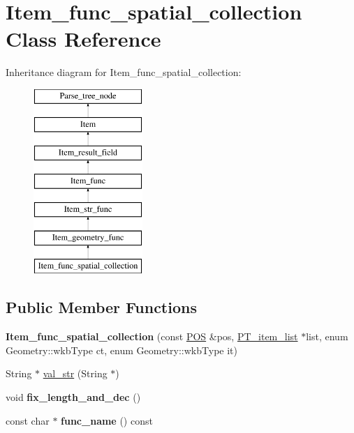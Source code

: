 \hypertarget{classItem__func__spatial__collection}{}\section{Item\+\_\+func\+\_\+spatial\+\_\+collection Class Reference}
\label{classItem__func__spatial__collection}
Inheritance diagram for Item\+\_\+func\+\_\+spatial\+\_\+collection\+:\begin{figure}[H]
\begin{center}
\leavevmode
\includegraphics[height=7.000000cm]{classItem__func__spatial__collection}
\end{center}
\end{figure}
\subsection*{Public Member Functions}
\begin{DoxyCompactItemize}
\item 
\mbox{\label{classItem__func__spatial__collection_a0f39bc3d337ad53420d9f9ff9d5c6001}} 
{\bfseries Item\+\_\+func\+\_\+spatial\+\_\+collection} (const \mbox{\hyperlink{structYYLTYPE}{P\+OS}} \&pos, \mbox{\hyperlink{classPT__item__list}{P\+T\+\_\+item\+\_\+list}} $\ast$list, enum Geometry\+::wkb\+Type ct, enum Geometry\+::wkb\+Type it)
\item 
String $\ast$ \mbox{\hyperlink{classItem__func__spatial__collection_a3eab68a38b40a1b60fc3ed4646f0465b}{val\+\_\+str}} (String $\ast$)
\item 
\mbox{\label{classItem__func__spatial__collection_a4ba12cec8d9de2b4b725c86e2b49128e}} 
void {\bfseries fix\+\_\+length\+\_\+and\+\_\+dec} ()
\item 
\mbox{\label{classItem__func__spatial__collection_a95069f0f21fd967b67ad80dbe396e147}} 
const char $\ast$ {\bfseries func\+\_\+name} () const
\end{DoxyCompactItemize}
